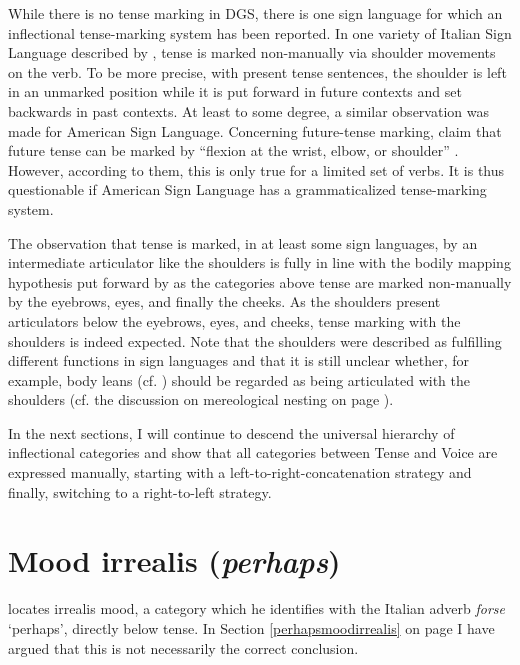 \noindent While there is no tense marking in DGS, there is one sign language for which an inflectional tense-marking system has been reported. In one variety of Italian Sign Language described by \citet{zucchi2009along}, tense is marked non-manually via shoulder movements on the verb. To be more precise, with present tense sentences, the shoulder is left in an unmarked position while it is put forward in future contexts and set backwards in past contexts. At least to some degree, a similar observation was made for American Sign Language. Concerning future-tense marking, \citet{jacobowitz1988signs} claim that future tense can be marked by ``flexion at the wrist, elbow, or shoulder'' \citep[337]{jacobowitz1988signs}. However, according to them, this is only true for a limited set of verbs. It is thus questionable if American Sign Language has a grammaticalized tense-marking system.

The observation that tense is marked, in at least some sign languages, by an intermediate articulator like the shoulders is fully in line with the bodily mapping hypothesis put forward by  \citet{bross2017scope} as the categories above tense are marked non-manually by the eyebrows, eyes, and finally the cheeks. As the shoulders present articulators below the eyebrows, eyes, and cheeks, tense marking with the shoulders is indeed expected. Note that the shoulders were described as fulfilling different functions in sign languages and that it is still unclear whether, for example, body leans (cf. \citealt{wilbur1998body}) should be regarded as being articulated with the shoulders (cf. the discussion on mereological nesting on page \pageref{nesting}).

In the next sections, I will continue to descend the universal hierarchy of inflectional categories and show that all categories between Tense and Voice are expressed manually, starting with a left-to-right-concatenation strategy and finally, switching to a right-to-left strategy.


\section{Mood irrealis (\textit{perhaps})}
\citet{cinque1999adverbs} locates irrealis mood, a category which he identifies with the Italian adverb \textit{forse} `perhaps', directly below tense. In Section \ref{perhapsmoodirrealis} on page \pageref{perhapsmoodirrealis} I have argued that this is not necessarily the correct conclusion.


